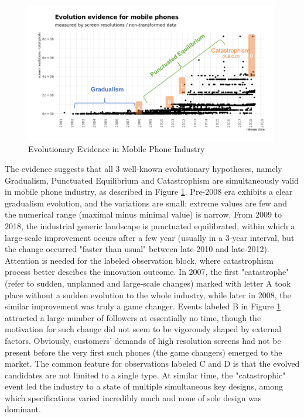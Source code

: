 \documentclass[utf8,english]{gradu3}
\begin{document}
\begin{figure}[htb]
    \centering
    \includegraphics[width=0.99\textwidth]{evo.png}
    \caption{Evolutionary Evidence in Mobile Phone Industry}
    \label{fig:evoMethods}
\end{figure}

The evidence suggests that all 3 well-known evolutionary hypotheses, namely Gradualism, Punctuated Equilibrium and Catastrophism are simultaneously valid in mobile phone industry, as described in Figure \ref{fig:evoMethods}. Pre-2008 era exhibits a clear gradualism evolution, and the variations are small; extreme values are few and the numerical range (maximal minus minimal value) is narrow. From 2009 to 2018, the industrial generic landscape is punctuated equilibrated, within which a large-scale improvement occurs after a few year (usually in a 3-year interval, but the change occurred "faster than usual" between late-2010 and late-2012). Attention is needed for the labeled observation block, where catastrophism process better descibes the innovation outcome. In 2007, the first "catastrophe" (refer to sudden, unplanned and large-scale changes) marked with letter A took place without a sudden evolution to the whole industry, while later in 2008, the similar improvement was truly a game changer. Events labeled B in Figure \ref{fig:evoMethods} attracted a large number of followers at essentially no time, though the motivation for such change did not seem to be vigorously shaped by external factors. Obviously, customers' demands of high resolution screens had not be present before the very first such phones (the game changers) emerged to the market. The common feature for observations labeled C and D is that the evolved candidates are not limited to a single type. At similar time, the "catastrophic" event led the industry to a state of multiple simultaneous key designs, among which specifications varied incredibly much and none of sole design was dominant. 
\end{document}
